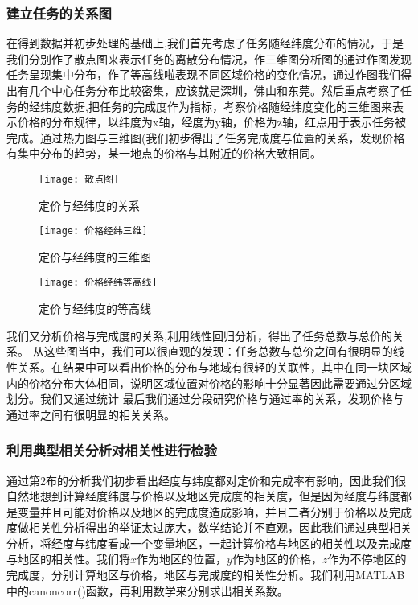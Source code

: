 \documentclass{ctexart}
\begin{document}
\subsubsection{建立任务的关系图}
在得到数据并初步处理的基础上,我们首先考虑了任务随经纬度分布的情况，于是我们分别作了散点图来表示任务的离散分布情况，作三维图分析图的通过作图发现任务呈现集中分布，作了等高线啦表现不同区域价格的变化情况，通过作图我们得出有几个中心任务分布比较密集，应该就是深圳，佛山和东莞。然后重点考察了任务的经纬度数据,把任务的完成度作为指标，考察价格随经纬度变化的三维图来表示价格的分布规律，以纬度为x轴，经度为y轴，价格为z轴，红点用于表示任务被完成。通过热力图与三维图(我们初步得出了任务完成度与位置的关系，发现价格有集中分布的趋势，某一地点的价格与其附近的价格大致相同。
\begin{figure}[htbp] 
\centering
\texttt{[image: 散点图]} 
\caption{定价与经纬度的关系}
\end{figure}
\begin{figure}[htbp] 
\centering
\texttt{[image: 价格经纬三维]} 
\caption{定价与经纬度的三维图}
\end{figure}
\begin{figure}[htbp] 
\centering
\texttt{[image: 价格经纬等高线]} 
\caption{定价与经纬度的等高线}
\end{figure}
\newpage
我们又分析价格与完成度的关系,利用线性回归分析，得出了任务总数与总价的关系。
从这些图当中，我们可以很直观的发现：任务总数与总价之间有很明显的线性关系。在结果中可以看出价格的分布与地域有很轻的关联性，其中在同一块区域内的价格分布大体相同，说明区域位置对价格的影响十分显著因此需要通过分区域划分。我们又通过统计
最后我们通过分段研究价格与通过率的关系，发现价格与通过率之间有很明显的相关关系。

\subsubsection{利用典型相关分析对相关性进行检验}
通过第2布的分析我们初步看出经度与纬度都对定价和完成率有影响，因此我们很自然地想到计算经度纬度与价格以及地区完成度的相关度，但是因为经度与纬度都是变量并且可能对价格以及地区的完成度造成影响，并且二者分别于价格以及完成度做相关性分析得出的举证太过庞大，数学结论并不直观，因此我们通过典型相关分析，将经度与纬度看成一个变量地区，一起计算价格与地区的相关性以及完成度与地区的相关性。我们将$x$作为地区的位置，$y$作为地区的价格，$z$作为不停地区的完成度，分别计算地区与价格，地区与完成度的相关性分析。我们利用MATLAB中的canoncorr()函数，再利用数学来分别求出相关系数。
\end{document}

